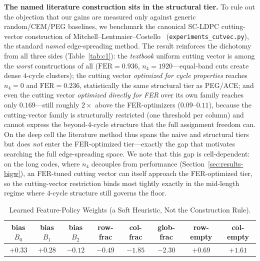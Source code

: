 \documentclass[journal]{IEEEtran}
\begin{document}
\textbf{The named literature construction sits in the structural tier.} To rule
out the objection that our gains are measured only against generic random/CEM/PEG
baselines, we benchmark the canonical SC-LDPC cutting-vector construction of
Mitchell--Lentmaier--Costello~\cite{mitchell2015scldpc}
(\texttt{experiments\_cutvec.py}), the standard \emph{named} edge-spreading
method. The result reinforces the dichotomy from all three sides
(Table~\ref{tab:c1}): the \emph{textbook} uniform cutting vector is among the
\emph{worst} constructions of all ($\text{FER}=0.936$, $n_4=1920$---equal-band
cuts create dense $4$-cycle clusters); the cutting vector \emph{optimized for
cycle properties} reaches $n_4{=}0$ and $\text{FER}=0.236$, statistically the same
structural tier as PEG/ACE; and even the cutting vector \emph{optimized directly
for FER} over its own family reaches only $0.169$---still roughly $2\times$ above
the FER-optimizers ($0.09$--$0.11$), because the cutting-vector family is
structurally restricted (one threshold per column) and cannot express the
beyond-$4$-cycle structure that the full assignment freedom can. On the deep cell
the literature method thus spans the naive and structural tiers but does
\emph{not} enter the FER-optimized tier---exactly the gap that motivates searching
the full edge-spreading space. We note that this gap is cell-dependent: on the
long codes, where $n_4$ decouples from performance
(Section~\ref{sec:results-bigw}), an FER-tuned cutting vector can itself approach
the FER-optimized tier, so the cutting-vector restriction binds most tightly
exactly in the mid-length regime where $4$-cycle structure still governs the
floor.

\begin{table}[t]
\centering
\caption{Learned Feature-Policy Weights (a Soft Heuristic, Not the Construction
Rule).}
\label{tab:theta}
\renewcommand{\arraystretch}{1.2}
\setlength{\tabcolsep}{3pt}
\scriptsize
\begin{tabular}{@{}cccccccc@{}}
\toprule
bias $B_0$ & bias $B_1$ & bias $B_2$ & row-frac & \textbf{col-frac}
& \textbf{glob-frac} & row-empty & \textbf{col-empty}\\
\midrule
$+0.33$ & $+0.28$ & $-0.12$ & $-0.49$ & $\mathbf{-1.85}$ & $\mathbf{-2.30}$
& $+0.69$ & $\mathbf{+1.61}$\\
\bottomrule
\end{tabular}
\end{table}
\end{document}
